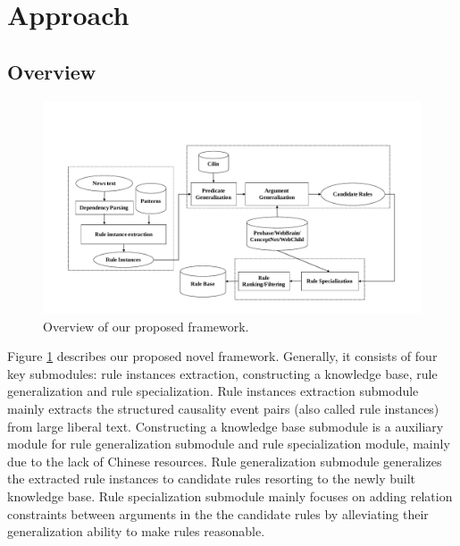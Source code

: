 %
%



\section{Approach}
\label{sec:approach}

\subsection{Overview}
\begin{figure}[htbp]
	\centerline{\includegraphics[width=\textwidth]{figures/approach}}
	\caption{Overview of our proposed framework.}
	\label{fig:approach}
\end{figure}

Figure \ref{fig:approach} describes our proposed novel framework. Generally, it consists of four key submodules: rule instances extraction, constructing a knowledge base, rule generalization and rule specialization. Rule instances extraction submodule mainly extracts the structured causality event pairs (also called rule instances) from large liberal text. Constructing a knowledge base submodule is a auxiliary module for rule generalization submodule and rule specialization module, mainly due to the lack of Chinese resources. Rule generalization submodule generalizes the extracted rule instances to candidate rules resorting to the newly built knowledge base. Rule specialization submodule mainly focuses on adding relation constraints between arguments in the the candidate rules by alleviating their generalization ability to make rules reasonable. 

